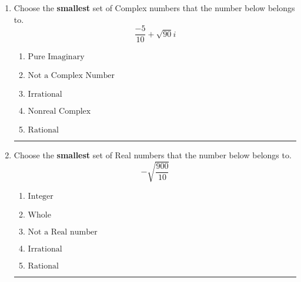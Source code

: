 \documentclass[14pt]{extbook}
\newcommand{\litem}[1]{\item#1\hspace*{-1cm}\rule{\textwidth}{0.4pt}}
\begin{document}
\begin{enumerate}
{\begin{enumerate}[label=\Alph*.]
\end{enumerate} }
\litem{
Choose the \textbf{smallest} set of Complex numbers that the number below belongs to.\[ \frac{-5}{10}+\sqrt{90} i \]\begin{enumerate}[label=\Alph*.]
\item \( \text{Pure Imaginary} \)
\item \( \text{Not a Complex Number} \)
\item \( \text{Irrational} \)
\item \( \text{Nonreal Complex} \)
\item \( \text{Rational} \)

\end{enumerate} }
\litem{
Choose the \textbf{smallest} set of Real numbers that the number below belongs to.\[ -\sqrt{\frac{900}{10}} \]\begin{enumerate}[label=\Alph*.]
\item \( \text{Integer} \)
\item \( \text{Whole} \)
\item \( \text{Not a Real number} \)
\item \( \text{Irrational} \)
\item \( \text{Rational} \)

\end{enumerate} }
\end{enumerate}
\end{document}
